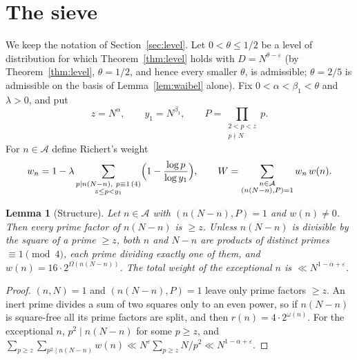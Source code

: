 \documentclass[11pt]{amsart}
\newtheorem{lemma}[theorem]{Lemma}
\theoremstyle{remark}
\newcommand{\cA}{\mathcal{A}}
\newcommand{\e}{\varepsilon}
\begin{document}
\section{The sieve}\label{sec:sieve}

We keep the notation of Section~\ref{sec:level}. Let $0<\theta\le1/2$ be a level of distribution for which Theorem~\ref{thm:level} holds with $D=N^{\theta-\e}$ (by Theorem~\ref{thm:level}, $\theta=1/2$, and hence every smaller $\theta$, is admissible; $\theta=2/5$ is admissible on the basis of Lemma~\ref{lem:waibel} alone). Fix $0<\alpha<\beta_1<\theta$ and $\lambda>0$, and put
\[
z=N^{\alpha},\qquad y_1=N^{\beta_1},\qquad P=\prod_{\substack{2<p<z\\ p\nmid N}}p .
\]
For $n\in\cA$ define Richert's weight
\[
w_n=1-\lambda\sum_{\substack{p\mid n(N-n),\ p\equiv1\,(4)\\ z\le p<y_1}}\Bigl(1-\frac{\log p}{\log y_1}\Bigr),\qquad
W=\sum_{\substack{n\in\cA\\ (n(N-n),P)=1}}w_n\,w(n).
\]

\begin{lemma}[Structure]\label{lem:structure}
Let $n\in\cA$ with $(n(N-n),P)=1$ and $w(n)\ne0$. Then every prime factor of $n(N-n)$ is $\ge z$. Unless $n(N-n)$ is divisible by the square of a prime $\ge z$, both $n$ and $N-n$ are products of distinct primes $\equiv1\pmod4$, each prime dividing exactly one of them, and $w(n)=16\cdot2^{\Omega(n(N-n))}$. The total weight of the exceptional $n$ is $\ll N^{1-\alpha+\e}$.
\end{lemma}
\begin{proof}
$(n,N)=1$ and $(n(N-n),P)=1$ leave only prime factors $\ge z$. An inert prime divides a sum of two squares only to an even power, so if $n(N-n)$ is square-free all its prime factors are split, and then $r(n)=4\cdot2^{\omega(n)}$. For the exceptional $n$, $p^2\mid n(N-n)$ for some $p\ge z$, and $\sum_{p\ge z}\sum_{p^2\mid n(N-n)}w(n)\ll N^{\e}\sum_{p\ge z}N/p^2\ll N^{1-\alpha+\e}$.
\end{proof}
\end{document}
